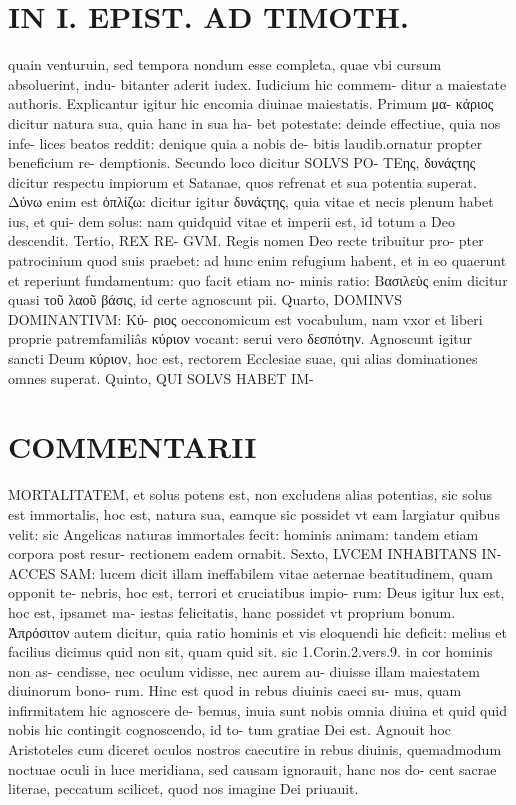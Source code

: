 \documentclass{article}
\begin{document}
\begin{pages}
\section*{IN I. EPIST. AD TIMOTH. }
\marginpar{[ p.165 ]}\pstart quain venturuin, sed tempora nondum esse completa, quae vbi cursum absoluerint, indu- bitanter aderit iudex. Iudicium hic commem- ditur a maiestate authoris. Explicantur igitur hic encomia diuinae maiestatis. Primum μα- κάριος dicitur natura sua, quia hanc in sua ha- bet potestate: deinde effectiue, quia nos infe- lices beatos reddit: denique quia a nobis de- bitis laudib.ornatur propter beneficium re- demptionis. Secundo loco dicitur SOLVS PO- ΤEης, δυνάςτης dicitur respectu impiorum et Satanae, quos refrenat et sua potentia superat. Δύνω enim est ὁπλίζω: dicitur igitur δυνάςτης, quia vitae et necis plenum habet ius, et qui- dem solus: nam quidquid vitae et imperii est, id totum a Deo descendit. Tertio, REX RE- GVM. Regis nomen Deo recte tribuitur pro- pter patrocinium quod suis praebet: ad hunc enim refugium habent, et in eo quaerunt et reperiunt fundamentum: quo facit etiam no- minis ratio: Βασιλεὺς enim dicitur quasi τοῦ λαοῦ βάσις, id certe agnoscunt pii.  \pend\pstart Quarto, DOMINVS DOMINANTIVM: Κύ- ριος oecconomicum est vocabulum, nam vxor et liberi proprie patremfamiliâs κύριον vocant: serui vero δεσπότην. Agnoscunt igitur sancti Deum κύριον, hoc est, rectorem Ecclesiae suae, qui alias dominationes omnes superat.  \pend\pstart Quinto, QUI SOLVS HABET IM-  \pend
\section*{COMMENTARII }
\marginpar{[ p.166 ]}\pstart MORTALITATEM, et solus potens est, non excludens alias potentias, sic solus est immortalis, hoc est, natura sua, eamque sic possidet vt eam largiatur quibus velit: sic Angelicas naturas immortales fecit: hominis animam: tandem etiam corpora post resur- rectionem eadem ornabit.  \pend\pstart Sexto, LVCEM INHABITANS IN- ACCES SAM: lucem dicit illam ineffabilem vitae aeternae beatitudinem, quam opponit te- nebris, hoc est, terrori et cruciatibus impio- rum: Deus igitur lux est, hoc est, ipsamet ma- iestas felicitatis, hanc possidet vt proprium bonum. Ἀπρόσιτον autem dicitur, quia ratio hominis et vis eloquendi hic deficit: melius et facilius dicimus quid non sit, quam quid sit. sic 1.Corin.2.vers.9. in cor hominis non as- cendisse, nec oculum vidisse, nec aurem au- diuisse illam maiestatem diuinorum bono- rum. Hinc est quod in rebus diuinis caeci su- mus, quam infirmitatem hic agnoscere de- bemus, inuia sunt nobis omnia diuina et quid quid nobis hic contingit cognoscendo, id to- tum gratiae Dei est. Agnouit hoc Aristoteles cum diceret oculos nostros caecutire in rebus diuinis, quemadmodum noctuae oculi in luce meridiana, sed causam ignorauit, hanc nos do- cent sacrae literae, peccatum scilicet, quod nos imagine Dei priuauit.  \pend

\end{pages}
\end{document}
